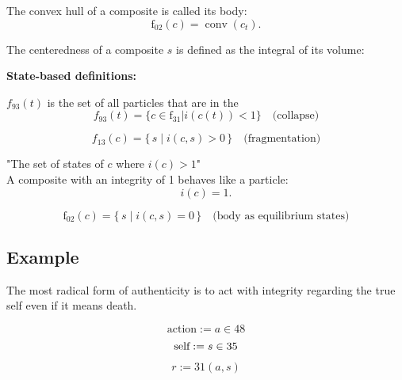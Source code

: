 \documentclass[12pt]{article}
\begin{document}
The convex hull of a composite is called its body:
\[
\text{f}_{02}(c) = \operatorname{conv}(c_t).
\]

The centeredness of a composite $s$ is defined as the integral of its volume:

\bigskip

\textbf{State-based definitions:}

$f_{93}(t)$ is the set of all particles that are in the  
\[
f_{93}(t) = \{c\in \text{f}_{31} |i(c(t)) < 1\} \quad \text{(collapse)}
\]

\[
f_{13}(c) = \{\, s \mid i(c,s) > 0 \,\} \quad \text{(fragmentation)}
\]

"The set of states of $c$ where $i(c) > 1$"\\

A composite with an integrity of 1 behaves like a particle:
\[
i(c) = 1.
\]

\[
\text{f}_{02}(c) = \{\, s \mid i(c,s) = 0 \,\} \quad \text{(body as equilibrium states)}
\]

\subsection{Example}

The most radical form of authenticity is to act with integrity regarding the true self even if it means death.

\[
\text{action} := a \in 48
\]
\[
\text{self} := s \in 35\\
\]
\[
r := 31(a, s) 
\]
\end{document}
